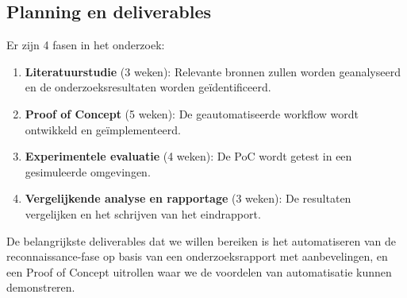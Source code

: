 \subsection{Planning en deliverables}
Er zijn 4 fasen in het onderzoek:
\begin{enumerate}
    \item \textbf{Literatuurstudie} (3 weken): Relevante bronnen zullen worden geanalyseerd en de onderzoeksresultaten worden geïdentificeerd.
    \item \textbf{Proof of Concept} (5 weken): De geautomatiseerde workflow wordt ontwikkeld en geïmplementeerd.
    \item \textbf{Experimentele evaluatie} (4 weken): De PoC wordt getest in een gesimuleerde omgevingen.
    \item \textbf{Vergelijkende analyse en rapportage} \newline (3 weken): De resultaten vergelijken en het schrijven van het eindrapport.
\end{enumerate}

De belangrijkste deliverables dat we willen bereiken is het automatiseren van de reconnaissance-fase op
basis van een onderzoeksrapport met aanbevelingen, en een Proof of Concept uitrollen waar we de voordelen
van automatisatie kunnen demonstreren.




